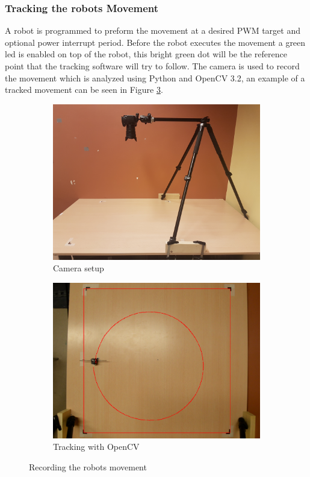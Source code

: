 \subsubsection{Tracking the robots Movement}

A robot is programmed to preform the movement at a desired PWM target and optional power interrupt period.
Before the robot executes the movement a green led is enabled on top of the robot, this bright green dot will be the reference point that the tracking software will try to follow.
The camera is used to record the movement which is analyzed using Python and OpenCV 3.2, an example of a tracked movement can be seen in Figure \ref{fig:movement_example}.

\begin{figure}
	\centering
	\begin{subfigure}[b]{0.45\textwidth}
		\includegraphics[width=\textwidth]{pics/movement_setup.jpg}
		\caption{Camera setup}
		\label{fig:movement_setup}
	\end{subfigure}
	\quad
	\begin{subfigure}[b]{0.45\textwidth}
		\includegraphics[width=\textwidth]{pics/movement_example.png}
		\caption{Tracking with OpenCV}
		\label{fig:movement_example}
	\end{subfigure}
	\caption{Recording the robots movement}
\end{figure}



